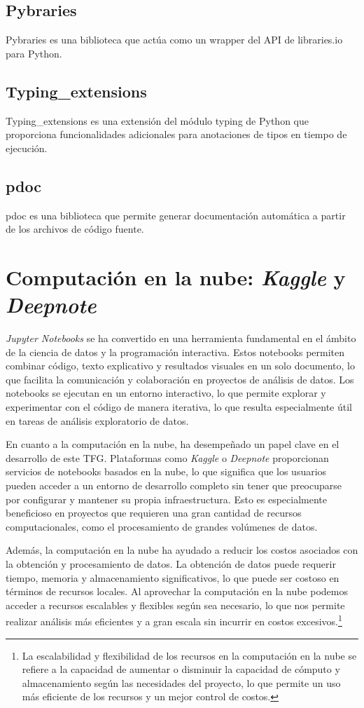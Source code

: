 \subsection{Pybraries}
Pybraries es una biblioteca que actúa como un wrapper del API de libraries.io para Python.

\subsection{Typing\_extensions}
Typing\_extensions es una extensión del módulo typing de Python que proporciona funcionalidades adicionales para anotaciones de tipos en tiempo de ejecución.

\subsection{pdoc}
pdoc es una biblioteca que permite generar documentación automática a partir de los archivos de código fuente.

\section{Computación en la nube: \textit{Kaggle} y \textit{Deepnote}}

\textit{Jupyter Notebooks} se ha convertido en una herramienta fundamental en el ámbito de la ciencia de datos y 
la programación interactiva. Estos notebooks permiten combinar código, texto explicativo y resultados 
visuales en un solo documento, lo que facilita la comunicación y colaboración en proyectos de análisis 
de datos. Los notebooks se ejecutan en un entorno interactivo, lo que permite explorar y experimentar 
con el código de manera iterativa, lo que resulta especialmente útil en tareas de análisis exploratorio 
de datos.

En cuanto a la computación en la nube, ha desempeñado un papel clave en el desarrollo de este TFG.
Plataformas como \textit{Kaggle} o \textit{Deepnote} proporcionan servicios de notebooks basados en la nube, lo que 
significa que los usuarios pueden acceder a un entorno de desarrollo completo sin tener que preocuparse 
por configurar y mantener su propia infraestructura. Esto es especialmente beneficioso en proyectos 
que requieren una gran cantidad de recursos computacionales, como el procesamiento de grandes volúmenes
 de datos.

Además, la computación en la nube ha ayudado a reducir los costos asociados con la obtención y 
procesamiento de datos. La obtención de datos puede requerir tiempo, memoria y almacenamiento 
significativos, lo que puede ser costoso en términos de recursos locales. Al aprovechar la computación 
en la nube podemos acceder a recursos escalables y flexibles según 
sea necesario, lo que nos permite realizar análisis más eficientes y a gran escala sin incurrir en 
costos excesivos.\footnote{La escalabilidad y flexibilidad de los recursos en la computación en la 
nube se refiere a la capacidad de aumentar o disminuir la capacidad de cómputo y almacenamiento 
según las necesidades del proyecto, lo que permite un uso más eficiente de los recursos y un mejor 
control de costos.}

